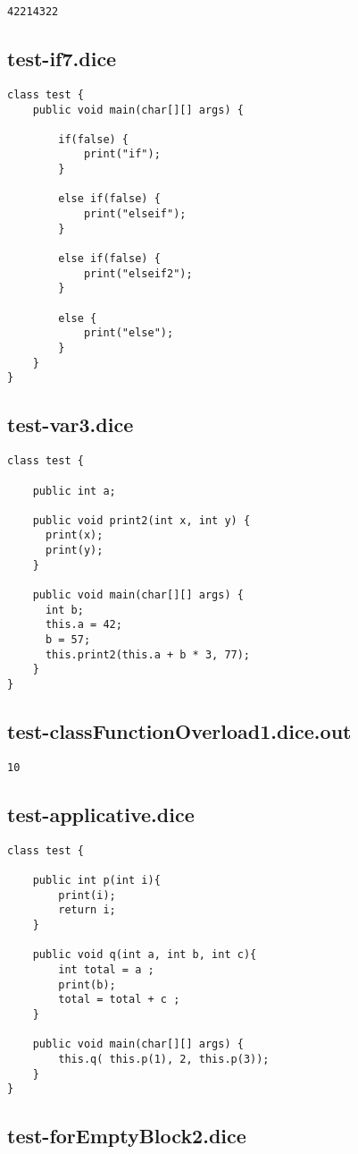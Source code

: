 \begin{verbatim}
42214322
\end{verbatim}\pagebreak\subsection{test-if7.dice}
\begin{verbatim}
class test {
	public void main(char[][] args) {

		if(false) { 
			print("if");
		} 
		
		else if(false) { 
			print("elseif"); 
		}

		else if(false) {
			print("elseif2");
		}

		else {
			print("else");
		}
	}
}
\end{verbatim}\pagebreak\subsection{test-var3.dice}
\begin{verbatim}
class test {

	public int a;

	public void print2(int x, int y) {
	  print(x);
	  print(y);
	}

	public void main(char[][] args) {
	  int b;
	  this.a = 42;
	  b = 57;
	  this.print2(this.a + b * 3, 77);
	}
}
\end{verbatim}\pagebreak\subsection{test-classFunctionOverload1.dice.out}
\begin{verbatim}
10
\end{verbatim}\pagebreak\subsection{test-applicative.dice}
\begin{verbatim}
class test {
	
	public int p(int i){ 
		print(i); 
		return i; 
	}

	public void q(int a, int b, int c){ 
		int total = a ; 
		print(b); 
		total = total + c ; 
	}
	
	public void main(char[][] args) {
		this.q( this.p(1), 2, this.p(3));
	}
}
\end{verbatim}\pagebreak\subsection{test-forEmptyBlock2.dice}
